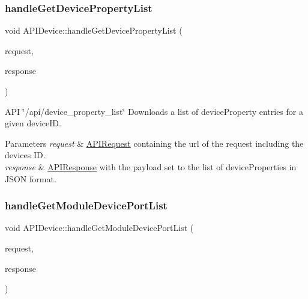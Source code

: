 \subsubsection{\texorpdfstring{handle\+Get\+Device\+Property\+List}{handleGetDevicePropertyList}}
{\footnotesize\ttfamily void A\+P\+I\+Device\+::handle\+Get\+Device\+Property\+List (\begin{DoxyParamCaption}\item[{const \hyperlink{class_a_p_i_request}{A\+P\+I\+Request} \&}]{request,  }\item[{\hyperlink{class_a_p_i_response}{A\+P\+I\+Response} $\ast$}]{response }\end{DoxyParamCaption})\hspace{0.3cm}{\ttfamily [slot]}}

A\+PI \char`\"{}/api/device\+\_\+property\+\_\+list\char`\"{} Downloads a list of device\+Property entries for a given device\+ID. 
\begin{DoxyParams}{Parameters}
{\em request} & \hyperlink{class_a_p_i_request}{A\+P\+I\+Request} containing the url of the request including the device\textquotesingle{}s ID. \\
\hline
{\em response} & \hyperlink{class_a_p_i_response}{A\+P\+I\+Response} with the payload set to the list of device\+Properties in J\+S\+ON format. \\
\hline
\end{DoxyParams}
\mbox{\label{class_a_p_i_device_ad5a4f48e5cf4767426fd179446501c53}} 
\subsubsection{\texorpdfstring{handle\+Get\+Module\+Device\+Port\+List}{handleGetModuleDevicePortList}}
{\footnotesize\ttfamily void A\+P\+I\+Device\+::handle\+Get\+Module\+Device\+Port\+List (\begin{DoxyParamCaption}\item[{const \hyperlink{class_a_p_i_request}{A\+P\+I\+Request} \&}]{request,  }\item[{\hyperlink{class_a_p_i_response}{A\+P\+I\+Response} $\ast$}]{response }\end{DoxyParamCaption})\hspace{0.3cm}{\ttfamily [slot]}}

